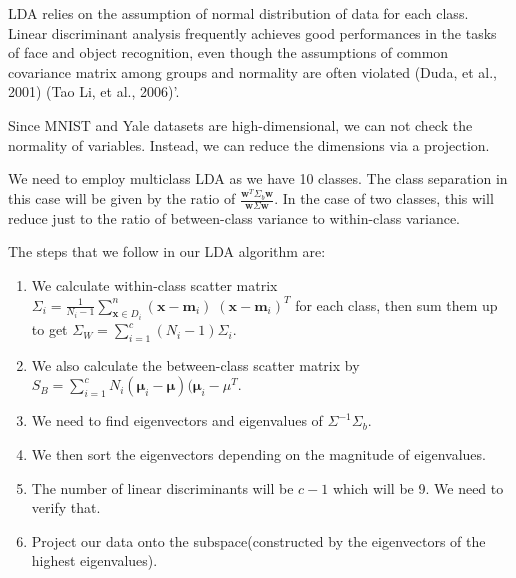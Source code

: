 \documentclass[]{../ncmathy}
\begin{document}
LDA relies on the assumption of normal distribution of data for each class. Linear discriminant analysis frequently achieves good performances in the tasks of face and object recognition, even though the assumptions of common covariance matrix among groups and normality are often violated (Duda, et al., 2001) (Tao Li, et al., 2006)'.

Since MNIST and Yale datasets are high-dimensional, we can not check the normality of variables. Instead, we can reduce the dimensions via a projection.

We need to employ multiclass LDA as we have 10 classes. The class separation in this case will be given by the ratio of $\frac{\pmb w^T \Sigma_b \pmb w}{\pmb w \Sigma \pmb w}$. In the case of two classes, this will reduce just to the ratio of between-class variance to within-class variance.

The steps that we follow in our LDA algorithm are: 
\begin{enumerate}
	\item We calculate within-class scatter matrix $\Sigma_i = \frac{1}{N_{i}-1} \sum\limits_{\pmb x \in D_i}^n (\pmb x - \pmb m_i)\;(\pmb x - \pmb m_i)^T$ for each class, then sum them up to get $\Sigma_W = \sum\limits_{i =1}^{c} (N_i - 1) \Sigma_i  $.
	\item We also calculate the between-class scatter matrix by $S_B = \sum\limits_{i =1}^c N_i (\pmb \mu_i - \pmb \mu) (\pmb \mu_i - \mu^T$.
	\item We need to find eigenvectors and eigenvalues of $\Sigma^{-1} \Sigma_b$.
	\item We then sort the eigenvectors depending on the magnitude of eigenvalues.
	\item The number of linear discriminants will be $c-1$ which will be 9. We need to verify that.
	\item Project our data onto the subspace(constructed by the eigenvectors of the highest eigenvalues).
\end{enumerate}
\end{document}
